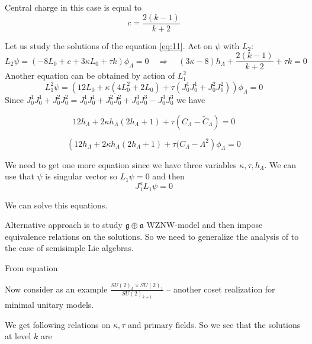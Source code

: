 \documentclass[a4paper]{jpconf}
\theoremstyle{definition}
\newcommand{\gf}{\mathfrak{g}}
\newcommand{\af}{\mathfrak{a}}
\theoremstyle{definition} \newtheorem{Def}{Definition}
\begin{document}
Central charge in this case is equal to
\begin{equation}
  \label{eq:14}
  c=\frac{2(k-1)}{k+2}
\end{equation}

Let us study the solutions of the equation \eqref{eq:11}. Act on $\psi$ with $L_{2}$:
\begin{equation}
  \label{eq:13}
  L_{2}\psi=(-8L_{0}+c+3\kappa L_{0}+\tau k)\phi_{\Lambda}=0\quad \Longrightarrow\quad  (3\kappa-8) h_{\Lambda}+\frac{2(k-1)}{k+2}+\tau k =0
\end{equation}
Another equation can be obtained by action of $L_{1}^{2}$
\begin{equation}
  \label{eq:15}
  L_{1}^{2}\psi = (12 L_{0} + \kappa(4 L_{0}^{2}+2 L_{0}) +\tau (J_{0}^{1}J_{0}^{1}+J_{0}^{2}J_{0}^{2}))\phi_{\Lambda}=0
\end{equation}
Since $J_{0}^{1}J_{0}^{1}+J_{0}^{2}J_{0}^{2}=J_{0}^{1}J_{0}^{1}+J_{0}^{2}J_{0}^{2}+J_{0}^{3}J_{0}^{3}-J_{0}^{3}J_{0}^{3}$ we have

\begin{equation}
  \label{eq:17}
  12 h_{\Lambda}+2\kappa h_{\Lambda} (2h_{\Lambda}+1) +  \tau (C_{\Lambda}-\tilde{C}_{\Lambda})=0
\end{equation}

\begin{equation}
  \label{eq:16}
  \left(12 h_{\Lambda}+2\kappa h_{\Lambda} (2h_{\Lambda}+1) +  \tau (C_{\Lambda}-\Lambda^{2}\right) \phi_{\Lambda}=0
\end{equation}

We need to get one more equation since we have three variables $\kappa,\tau,h_{\Lambda}$. We can use that $\psi$ is singular vector so $L_{1}\psi=0$ and then
\begin{equation}
  \label{eq:18}
  J_{1}^{a}L_{1}\psi=0
\end{equation}

We can solve this equations. 



Alternative approach is to study $\gf\oplus \af$ WZNW-model and then impose equivalence relations on the solutions. 
So we need to generalize the analysis of \cite{alekseev2010sle} to the case of semisimple Lie algebras. 

From equation 

Now consider as an example $\frac{SU(2)_{k}\times SU(2)_{1}}{SU(2)_{k+1}}$ -- another coset realization for minimal unitary models. 

We get following relations on $\kappa,\tau$ and primary fields. So we see that the solutions at level $k$ are 
\end{document}
